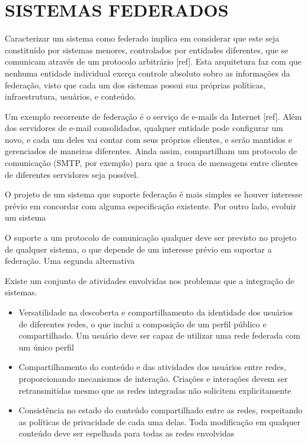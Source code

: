 \section{SISTEMAS FEDERADOS}


Caracterizar um sistema como federado implica em considerar que este seja
constituído por sistemas menores, controlados por entidades diferentes, que se
comunicam através de um protocolo arbitrário [ref]. Esta arquitetura faz com que 
nenhuma entidade individual exerça controle absoluto sobro as informações da 
federação, visto que cada um dos sistemas possui sua próprias políticas, 
infraestrutura, usuários, e conteúdo.


Um exemplo recorrente de federação é o serviço de e-mails da Internet [ref]. Além
dos servidores de e-mail consolidados, qualquer entidade pode configurar um novo, e 
cada um deles vai contar com seus próprios clientes, e serão mantidos e gerenciados
de maneiras diferentes. Ainda assim, compartilham um protocolo de comunicação (SMTP,
por exemplo) para que a troca de mensagens entre clientes de diferentes servidores
seja possível.

O projeto de um sistema que suporte federação é mais simples se houver interesse
prévio em concordar com alguma especificação existente. Por outro lado, evoluir um
sistema 


O suporte a um protocolo de comunicação qualquer deve ser previsto no projeto de
qualquer sistema, o que depende de um interesse prévio em suportar a federação. Uma
segunda alternativa 



Existe um conjunto de atividades envolvidas nos problemas que  a integração
de sistemas.

\begin{itemize}
  \item{Versatilidade na descoberta e compartilhamento da identidade dos usuários
        de diferentes redes, o que inclui a composição de um perfil público e
        compartilhado. Um usuário deve ser capaz de utilizar uma rede federada com
        um único perfil}
  \item{Compartilhamento do conteúdo e das atividades dos usuários entre redes,
        proporcionando mecanismos de interação. Criações e interações devem ser
        retransmitidas mesmo que as redes integradas não solicitem explicitamente}
  \item{Consistência no estado do conteúdo compartilhado entre as redes, respeitando
        as políticas de privacidade de cada uma delas. Toda modificação em qualquer
        conteúdo deve ser espelhada para todas as redes envolvidas}
\end{itemize}

